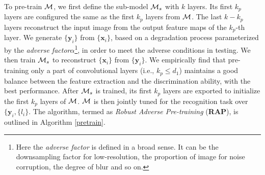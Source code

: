 \documentclass[10pt,twocolumn,twoside]{IEEEtran} %
\begin{document}
To pre-train ${\mathcal{M}}$, we first define the sub-model ${\mathcal{M}}_s$ with $k$ layers. Its first $k_p$ layers are configured the same as the first $k_p$ layers from ${\mathcal{M}}$. The last $k - k_p$ layers reconstruct the input image from the output feature maps of the $k_p$-th layer. 
We generate $\{\mathbf{y}_i\}$ from $\{\mathbf{x}_i\}$, based on a degradation process parameterized by the \textit{adverse factor}$\alpha$\footnote{Here the \textit{adverse factor} is defined in a broad sense. It can be the downsampling factor for low-resolution, the proportion of image for noise corruption, the degree of blur and so on.}, in order to meet the adverse conditions in testing. 
We then train ${\mathcal{M}}_s$ to reconstruct $\{\mathbf{x}_i\}$ from $\{\mathbf{y}_i\}$. 
We empirically find that pre-training only a part of convolutional layers (i.e., $k_p \leq d_1$) maintains a good balance between the feature extraction and the discrimination ability, with the best performance. After ${\mathcal{M}}_s$ is trained, its first $k_p$ layers are exported to initialize the first $k_p$ layers of ${\mathcal{M}}$. ${\mathcal{M}}$ is then jointly tuned for the recognition task over $\{\mathbf{y}_i, \{l_i\}$. The algorithm, termed as \textit{Robust Adverse Pre-training} (\textbf{RAP}), is outlined in Algorithm \ref{pretrain}.
\end{document}
